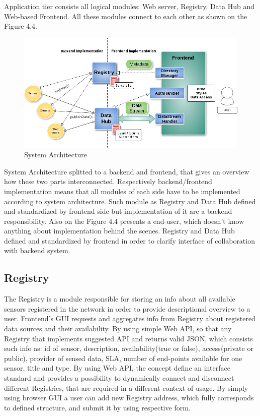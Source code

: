   Application tier consists all logical modules: Web server, Registry, Data Hub and Web-based Frontend. All these modules connect to each other as shown on the Figure 4.4. 
    \begin{figure}[!ht]
    \centering
    \includegraphics[scale=0.6]{images/Structure.png}   
    \caption[System Architecture]{System Architecture}                         
    \end{figure}

    System Architecture splitted to a backend and frontend, that gives an overview how these two parts interconnected. Respectively backend/frontend implementation means that all modules of each side have to be implemented according to system architecture. Such module as Registry and Data Hub defined and standardized by frontend side but implementation of it are a backend responsibility. Also on the Figure 4.4 presents a end-user, which doesn't know anything about implementation behind the scenes. Registry and Data Hub defined and standardized by frontend in order to clarify interface of collaboration with backend system.

  \subsection{Registry}
    The Registry is a module responsible for storing an info about all available sensors registered in the network in order to provide descriptional overview to a user. Frontend's GUI requests and aggregates info from Registry about registered data sources and their availability. By using simple Web API, so that any Registry that implements suggested API and returns valid JSON, which consists such info as: id of sensor, description, availability(true or false), access(private or public), provider of sensed data, SLA, number of end-points available for one sensor, title and type. By using Web API, the concept define an interface standard and provides a possibility to dynamically connect and disconnect different Registries, that are required in a different context of usage. By simply using browser GUI a user can add new Registry address, which fully corresponds to defined structure, and submit it by using respective form.

